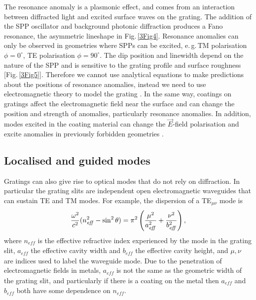 The resonance anomaly is a plasmonic effect, and comes from an interaction between diffracted light and excited surface waves on the grating. The addition of the SPP oscillator and background photonic diffraction produces a Fano resonance, the asymmetric lineshape in Fig.\,\ref{3Fig4}. Resonance anomalies can only be observed in geometries where SPPs can be excited, e.\,g.\,TM polarisation $\phi=0^{\circ}$, TE polarisation $\phi=90^{\circ}$. The dip position and linewidth depend on the nature of the SPP and is sensitive to the grating profile and surface roughness [Fig.\,\ref{3Fig5}]. Therefore we cannot use analytical equations to make predictions about the positions of resonance anomalies, instead we need to use electromagnetic theory to model the grating \cite{Hutley1982, Loewen1997}. In the same way, coatings on gratings affect the electromagnetic field near the surface and can change the position and strength of anomalies, particularly resonance anomalies. In addition, modes excited in the coating material can change the $\vec{E}$-field polarisation and excite anomalies in previously forbidden geometries \cite{Hutley1982, Loewen1997}.



\subsection{Localised and guided modes}
\label{sec:channel}
Gratings can also give rise to optical modes that do not rely on diffraction. In particular the grating slits are independent open electromagnetic waveguides that can sustain TE and TM modes. For example, the dispersion of a TE$_{\mu\nu}$ mode is \cite{Jackson1999}
\begin{equation}
\centering
\frac{\omega^2}{c^2}(n_{\mathit{eff}}^2-\sin^2\theta) = \pi^2\left(\frac{\mu^2}{a_{\mathit{eff}}^2}+\frac{\nu^2}{b_{\mathit{eff}}^2}\right) ,
\label{waveguide}
\end{equation}
where $n_{\mathit{eff}}$ is the effective refractive index experienced by the mode in the grating slit, $a_{\mathit{eff}}$ the effective cavity width and $b_{\mathit{eff}}$ the effective cavity height, and $\mu, \nu$ are indices used to label the waveguide mode. Due to the penetration of electromagnetic fields in metals, $a_{\mathit{eff}}$ is not the same as the geometric width of the grating slit, and particularly if there is a coating on the metal then $a_{\mathit{eff}}$ and $b_{\mathit{eff}}$ both have some dependence on $n_{\mathit{eff}}$. 

